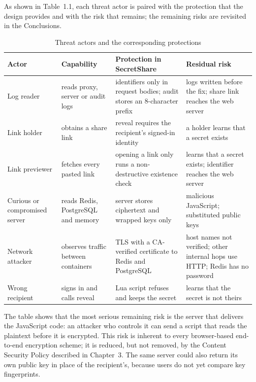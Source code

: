 \documentclass[12pt,a4paper]{article}
\numberwithin{equation}{section}
\numberwithin{figure}{section}
\numberwithin{table}{section}
\newcommand{\tablesetup}{\fontsize{11pt}{13pt}\selectfont\singlespacing\renewcommand{\arraystretch}{1.15}}
\newcommand{\leadin}[1]{%
  {\onehalfspacing\setlength{\parindent}{1.25cm}\indent #1\par}\vspace{8pt}}
\begin{document}
\begin{table}[H]
\leadin{As shown in Table~1.1, each threat actor is paired with the protection that the design provides and with the risk that remains; the remaining risks are revisited in the Conclusions.}
\tablesetup
\caption{Threat actors and the corresponding protections}
\label{tab:threats}
\begin{tabularx}{\textwidth}{|P{0.20\textwidth}|P{0.25\textwidth}|L|P{0.19\textwidth}|}
\hline
\textbf{Actor} & \textbf{Capability} & \textbf{Protection in SecretShare} & \textbf{Residual risk} \\ \hline
Log reader & reads proxy, server or audit logs & identifiers only in request bodies; audit stores an 8-character prefix & logs written before the fix; share link reaches the web server \\ \hline
Link holder & obtains a share link & reveal requires the recipient's signed-in identity & a holder learns that a secret exists \\ \hline
Link previewer & fetches every pasted link & opening a link only runs a non-destructive existence check & learns that a secret exists; identifier reaches the web server \\ \hline
Curious or compromised server & reads Redis, PostgreSQL and memory & server stores ciphertext and wrapped keys only & malicious JavaScript; substituted public keys \\ \hline
Network attacker & observes traffic between containers & TLS with a CA-verified certificate to Redis and PostgreSQL & host names not verified; other internal hops use HTTP; Redis has no password \\ \hline
Wrong recipient & signs in and calls reveal & Lua script refuses and keeps the secret & learns that the secret is not theirs \\ \hline
\end{tabularx}
\end{table}

The table shows that the most serious remaining risk is the server that delivers the JavaScript code: an attacker who controls it can send a script that reads the plaintext before it is encrypted. This risk is inherent to every browser-based end-to-end encryption scheme; it is reduced, but not removed, by the Content Security Policy described in Chapter~3. The same server could also return its own public key in place of the recipient's, because users do not yet compare key fingerprints.
\end{document}
